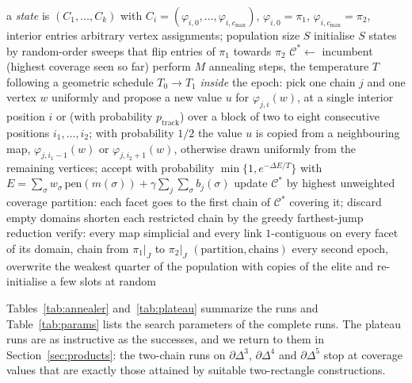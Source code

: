 \documentclass[12pt]{article}
\newcommand{\SC}{\mathrm{SC}}
\newcommand{\SCst}{\SC_{\mathrm{strict}}}
\begin{document}
\begin{algorithm}[H]
\caption{\textsc{ChainAnneal}($K$, $k$, $c_{\max}$; $S$, $\beta$,
$\gamma$, $p_{\mathrm{track}}$): anneal whole systems of $k$ chains over $K\times K$.}
\label{alg:anneal}
\begin{algorithmic}[1]
\Require a \emph{state} is $(C_1,\dots,C_k)$ with
$C_i=(\varphi_{i,0},\dots,\varphi_{i,c_{\max}})$,
$\varphi_{i,0}=\pi_1$, $\varphi_{i,c_{\max}}=\pi_2$, interior entries
arbitrary vertex assignments; population size $S$
\State initialise $S$ states by random-order sweeps that flip entries
of $\pi_1$ towards $\pi_2$
\State $\mathcal{C}^*\gets$ incumbent (highest coverage seen so far)
\State perform $M$ annealing steps, the temperature $T$ following a
geometric schedule $T_0\to T_1$ \emph{inside} the epoch: pick one chain
$j$ and one vertex $w$ uniformly and propose a new value $u$ for
$\varphi_{j,i}(w)$, at a single interior position $i$ or (with
probability $p_{\mathrm{track}}$) over a block of two to eight
consecutive positions $i_1,\dots,i_2$; with probability $1/2$ the value
$u$ is copied from a neighbouring map, $\varphi_{j,i_1-1}(w)$ or
$\varphi_{j,i_2+1}(w)$, otherwise drawn uniformly from the remaining
vertices; accept with probability $\min\{1,e^{-\Delta E/T}\}$
\Statex \hspace{2em} with
$E=\sum_\sigma w_\sigma\,\mathrm{pen}(m(\sigma))
+\gamma\sum_j\sum_\sigma b_j(\sigma)$
\EndFor
\State update $\mathcal{C}^*$ by highest unweighted coverage
\State partition: each facet goes to the first chain of $\mathcal{C}^*$
covering it; discard empty domains 
\State shorten each restricted chain by the greedy farthest-jump
reduction \cite[Algorithm~2]{OLGB21}
\State verify: every map simplicial and every link $1$-contiguous on
every facet of its domain, chain from $\pi_1|_J$ to $\pi_2|_J$
\State \Return $(\text{partition},\text{chains})$
\Comment{a certificate for $\SCst(K)\le k-1$}
\EndIf
\State every second epoch, overwrite the weakest quarter of the
population with copies of the elite and re-initialise a few slots at
random 
\EndFor
\end{algorithmic}
\end{algorithm}

Tables~\ref{tab:annealer} and~\ref{tab:plateau} summarize the runs and Table~\ref{tab:params}
lists the search parameters of the complete runs.  The plateau runs are as
instructive as the successes, and we return to them in
Section~\ref{sec:products}: the two-chain runs on $\partial\Delta^3$,
$\partial\Delta^4$ and $\partial\Delta^5$ stop at coverage values that
are exactly those attained by suitable two-rectangle constructions.
\end{document}
